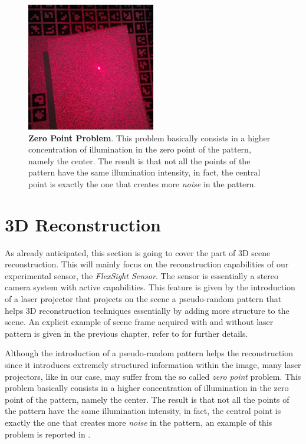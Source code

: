 \begin{figure}
    \centering
    \includegraphics[width=0.5\textwidth]{figures/4_experiments/laser_pattern_problem}
    \caption{\textbf{Zero Point Problem}. This problem basically consists in a higher concentration of illumination in the zero point of the pattern, namely the center. The result is that not all the points of the pattern have the same illumination intensity, in fact, the central point is exactly the one that creates more \emph{noise} in the pattern.}
    \label{fig:laser_pattern_problem}
\end{figure}

\section{3D Reconstruction}\label{sec:exp_3d_reconstruction}
As already anticipated, this section is going to cover the part of 3D scene reconstruction. This will mainly focus on the reconstruction capabilities of our experimental sensor, the \emph{FlexSight Sensor}. The sensor is essentially a stereo camera system with active capabilities. This feature is given by the introduction of a laser projector that projects on the scene a pseudo-random pattern that helps 3D reconstruction techniques essentially by adding more structure to the scene. An explicit example of scene frame acquired with and without laser pattern is given in the previous chapter, refer to  for further details.

Although the introduction of a pseudo-random pattern helps the reconstruction since it introduces extremely structured information within the image, many laser projectors, like in our case, may suffer from the so called \emph{zero point} problem. This problem basically consists in a higher concentration of illumination in the zero point of the pattern, namely the center. The result is that not all the points of the pattern have the same illumination intensity, in fact, the central point is exactly the one that creates more \emph{noise} in the pattern, an example of this problem is reported in .

